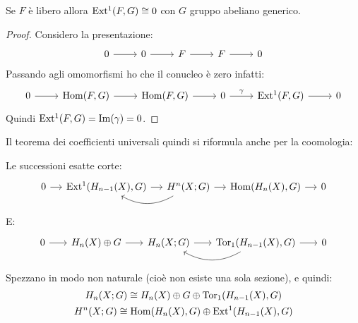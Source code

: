 \begin{lemma}
  Se $ F $ è libero allora $ \mathrm{Ext^1}( F, G) \cong 0 $ con $ G $ gruppo abeliano generico.
\end{lemma}
\begin{proof}
  Considero la presentazione:
  \[
    \begin{tikzcd}
      0 \rar & 0 \rar & F \rar & F \rar & 0
    \end{tikzcd}
  \]
  Passando agli omomorfismi ho che il conucleo è zero infatti:
  \[
    \begin{tikzcd}
      0 \rar & \hom{F,G} \rar & \hom{F,G} \rar & 0 \rar{\gamma} & \ext{F,G} \rar & 0
    \end{tikzcd}
  \]
  Quindi $ \mathrm{Ext^1}( F,G) = \mathrm{Im}( \gamma ) = 0 $.
\end{proof}
\eproof
Il teorema dei coefficienti universali quindi si riformula anche per la coomologia:
\begin{theorem}
  Le successioni esatte corte:
  \[
    \begin{tikzcd}[nodes = {column sep = 12 pt}]
      0 \rar & \ext{H_{n-1}(X), G} \rar & H^n(X;G) \arrow[bend left]{l}{} \rar & \hom{H_n(X), G} \rar & 0
    \end{tikzcd}
  \]
  E:
  \[
    \begin{tikzcd}[nodes = {column sep = 18 pt}]
      0 \rar & H_n(X) \oplus G \rar & H_n(X; G) \rar & \arrow[bend left]{l}{} \tor{H_{n-1}(X), G} \rar & 0
    \end{tikzcd}
  \]
  Spezzano in modo non naturale (cioè non esiste una sola sezione), e quindi:
  \begin{gather*}
    H_n(X; G) \cong H_n(X) \oplus G \oplus \mathrm{Tor_1}( H_{n-1}(X), G) \\
    H^n(X; G) \cong \mathrm{Hom}( H_n(X), G) \oplus \mathrm{Ext^1}( H_{n-1}(X), G)
  \end{gather*}
\end{theorem}
%
%
